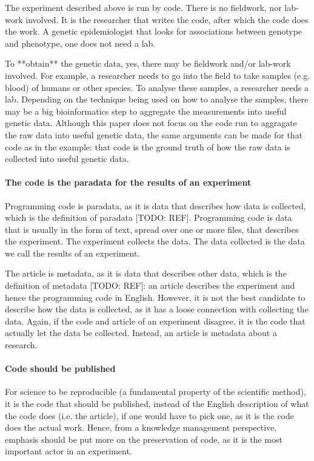 The experiment described above is run by code. There is no fieldwork,
nor lab-work involved. It is the researcher that writes the code,
after which the code does the work. A genetic epidemiologist that
looks for associations between genotype and phenotype,
one does not need a lab.

To **obtain** the genetic data, yes, there may be fieldwork and/or lab-work
involved. For example, a researcher needs to go into the field to take
samples (e.g. blood) of humans or other species. To analyse these samples,
a researcher needs a lab. Depending on the technique being used on
how to analyse the samples, there may be a big bioinformatics step
to aggregate the measurements into useful genetic data. 
Although this paper does not focus on the code run to 
aggragate the raw data into useful genetic data, the same arguments
can be made for that code as in the example: that code is 
the ground truth of how the raw data is collected into useful genetic data.

\paragraph{The code is the paradata for the results of an experiment}

Programming code is paradata, as it is data that describes how data is collected,
which is the definition of paradata [TODO: REF].
Programming code is data that is usually in the form of text, 
spread over one or more files, that describes the experiment.
The experiment collects the data.
The data collected is the data we call the results of an experiment.

The article is metadata, as it is data that describes other
data, which is the definition of metadata [TODO: REF]:
an article describes the
experiment and hence the programming
code in English. However, it is not the best
candidate to describe how the data is collected,
as it has a loose connection with collecting the data.
Again, if the code and article of an experiment disagree,
it is the code that actually let the data be collected.  
Instead, an article is metadata about a research.

\paragraph{Code should be published}

For science to be reproducible (a fundamental property of the scientific 
method), it is the code that should be published, instead of the
English description of what the code does (i.e. the article), if one
would have to pick one, as it is the code does the actual work.
Hence, from a knowledge management perspective, emphasis should be
put more on the preservation of code, as it is the most important actor
in an experiment.

